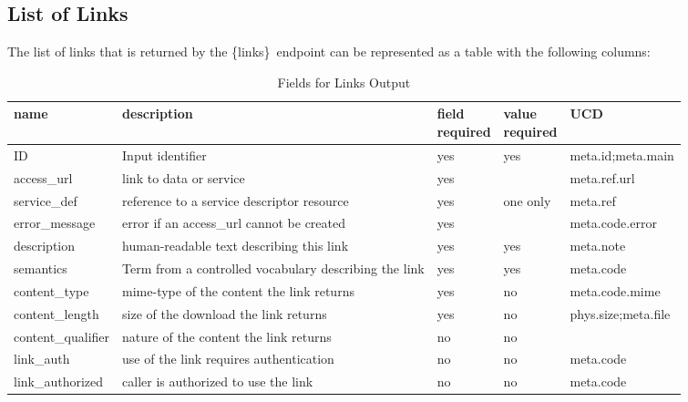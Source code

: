 \documentclass[11pt,a4paper]{ivoa}
\newcommand{\blinks}{\{links\}}
\begin{document}
\subsection{List of Links}
\label{sec:listOfLinks}

The list of links that is returned by the \blinks\ endpoint can be
represented as a table with the following columns:
\begin{table}[h]
\begin{center}
\begin{tabular}{|l|p{}|p{}|p{}|l|}
\hline
{\bf name}      & {\bf description} & {\bf field \newline required}
                & {\bf value \newline required} & {\bf UCD} \\
\hline
ID              & Input identifier & yes & yes & meta.id;meta.main \\
\hline
access\_url     & link to data or service 
                & yes &          & meta.ref.url \\
\cline{1-3} \cline{5-5}
service\_def    & reference to a service descriptor resource
                & yes & one only & meta.ref \\
\cline{1-3} \cline{5-5}
error\_message  & error if an access\_url cannot be created
                & yes &          & meta.code.error \\
\hline
description     & human-readable text describing this link
                & yes & yes & meta.note \\
\hline
semantics       & Term from a controlled vocabulary describing the link
                & yes & yes & meta.code \\
\hline
content\_type   & mime-type of the content the link returns
                & yes & no & meta.code.mime \\
\hline
content\_length & size of the download the link returns
                & yes & no & phys.size;meta.file \\
\hline
content\_qualifier & nature of the content the link returns
                & no & no & \\
\hline
link\_auth       & use of the link requires authentication
                 & no & no & meta.code \\
\hline
link\_authorized & caller is authorized to use the link
                 & no & no & meta.code \\
\hline
\end{tabular}
\end{center}
\caption{Fields for Links Output}
\label{fig:linkFields}
\end{table}
\end{document}
